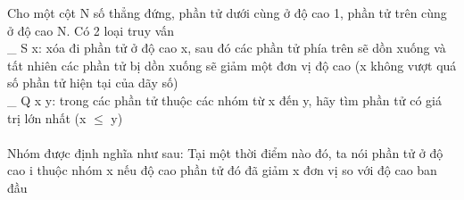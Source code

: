Cho một cột N số thẳng đứng, phần tử dưới cùng ở độ cao 1, phần tử trên cùng ở độ cao N. Có 2 loại truy vấn   
\\   \_ S x: xóa đi phần tử ở độ cao x, sau đó các phần tử phía trên sẽ dồn xuống và tất nhiên các phần tử bị dồn xuống sẽ giảm một đơn vị độ cao (x không vượt quá số phần tử hiện tại của dãy số)   
\\   \_ Q x y: trong các phần tử thuộc các nhóm từ x đến y, hãy tìm phần tử có giá trị lớn nhất (x $\le$ y)   
\\
\\   Nhóm được định nghĩa như sau: Tại một thời điểm nào đó, ta nói phần tử ở độ cao i thuộc nhóm x nếu độ cao phần tử đó đã giảm x đơn vị so với độ cao ban đầu